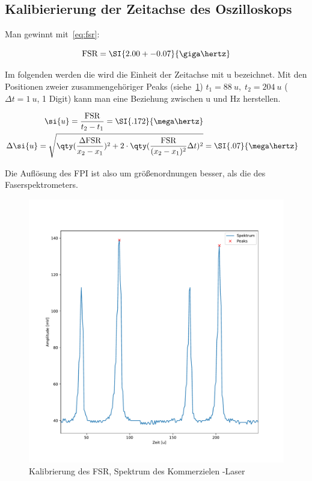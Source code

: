 \documentclass[slug=GL, room=HZDR\ Dresden/Rossendorf\,\ Geb.\ 620/123, supervisor=Tim\ Ziegler]{../../Lab_Report_LaTeX/lab_report}
\newcommand{\hne}{\ce{HeNe}-Laser}
\begin{document}
\subsection{Kalibierierung der Zeitachse des Oszilloskops}
\label{sec:kalibzeitausw}

Man gewinnt mit~\ref{eq:fsr}:

\begin{equation}
  \label{eq:realfsr}
  \text{FSR} = \SI{2.00+-0.07}{\giga\hertz}
\end{equation}

Im folgenden werden die wird die Einheit der Zeitachse mit \si{u}
bezeichnet. Mit den Positionen zweier zusammengeh\"origer Peaks (siehe~\ref{fig:fsrkalib})
\(t_1=\SI{88}{u},\; t_2=\SI{204}{u}\) (\(\Delta t = \SI{1}{u}\), 1 Digit)
kann man eine Beziehung zwischen \si{u} und \si{\hertz} herstellen.

\begin{eqnarray}
  \label{eq:unithertz}
  \si{u} = \frac{\text{FSR}}{t_2-t_1} =\SI{.172}{\mega\hertz} \\
  \Delta\si{u}  = \sqrt{\qty(\frac{\Delta\text{FSR}}{x_2-x_1})^2 +
  2\cdot\qty(\frac{\text{FSR}}{(x_2-x_1)^2}\Delta t)^2}  & = \SI{.07}{\mega\hertz}
\end{eqnarray}

Die Aufl\"osung des FPI ist also um gr\"o\ss{}enordnungen besser, als
die des Faserspektrometers.

\begin{figure}[h]\centering
  \includegraphics[width=.8\columnwidth]{figs/fsrkalib.pdf}
  \caption{Kalibrierung des FSR, Spektrum des Kommerzielen \hne{}}
  \label{fig:fsrkalib}
\end{figure}
\end{document}
